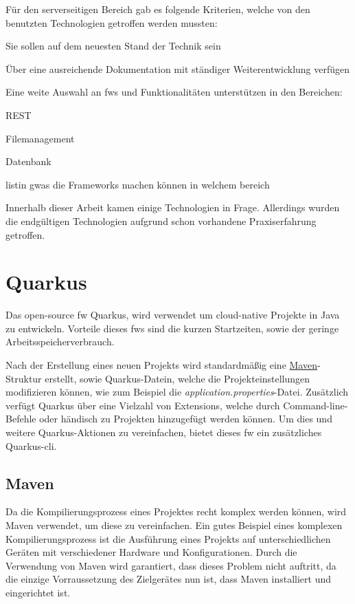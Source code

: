 Für den serverseitigen Bereich gab es folgende Kriterien, welche von den benutzten Technologien getroffen werden mussten:
\begin{compactitem}
    \item Sie sollen auf dem neuesten Stand der Technik sein
    \item Über eine ausreichende Dokumentation mit ständiger Weiterentwicklung verfügen
    \item Eine weite Auswahl an \glspl{fw} und Funktionalitäten unterstützen in den Bereichen:
    \begin{compactitem}
        \item REST
        \item Filemanagement
        \item Datenbank
    \end{compactitem}
\end{compactitem} 
listin gwas die Frameworks machen können in welchem bereich

Innerhalb dieser Arbeit kamen einige Technologien in Frage. 
Allerdings wurden die endgültigen Technologien aufgrund schon vorhandene Praxiserfahrung getroffen. 

\section{Quarkus}
Das open-source \gls{fw} Quarkus, wird verwendet um cloud-native Projekte in Java zu entwickeln. 
Vorteile dieses \glspl{fw} sind die kurzen Startzeiten, sowie der geringe Arbeitsspeicherverbrauch.
\cite{QuarkusHomepage}

Nach der Erstellung eines neuen Projekts wird standardmäßig eine \hyperref[ch::MavenTool]{Maven}-Struktur erstellt, sowie Quarkus-Datein, welche die Projekteinstellungen modifizieren können, wie zum Beispiel die \emph{application.properties}-Datei. 
Zusätzlich verfügt Quarkus über eine Vielzahl von Extensions, welche durch Command-line-Befehle oder händisch zu Projekten hinzugefügt werden können. 
Um dies und weitere Quarkus-Aktionen zu vereinfachen, bietet dieses \gls{fw} ein zusätzliches Quarkus-\gls{cli}.
\cite{QuarkusAbout, QuarkusFirstApplication}


\subsection{Maven}
\label{ch::MavenTool}
Da die Kompilierungsprozess eines Projektes recht komplex werden können, wird Maven verwendet, um diese zu vereinfachen.
Ein gutes Beispiel eines komplexen Kompilierungsprozess ist die Ausführung eines Projekts auf unterschiedlichen Geräten mit verschiedener Hardware und Konfigurationen.
Durch die Verwendung von Maven wird garantiert, dass dieses Problem nicht auftritt, da die einzige Vorraussetzung des Zielgerätes nun ist, dass Maven installiert und eingerichtet ist.

